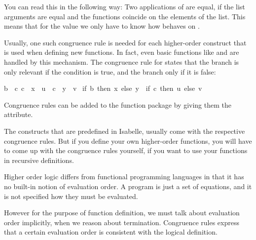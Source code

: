 \begin{isabellebody}
\begin{isamarkuptext}
  You can read this in the following way: Two applications of  are equal, if the list arguments are equal and the functions
  coincide on the elements of the list. This means that for the value 
   we only have to know how  behaves on
  .

  Usually, one such congruence rule is
  needed for each higher-order construct that is used when defining
  new functions. In fact, even basic functions like  and  are handled by this mechanism. The congruence
  rule for  states that the  branch is only
  relevant if the condition is true, and the  branch only if it
  is false:

  \begin{isabelle}%
{\isasymlbrakk}{\isacharquery}b\ {\isacharequal}\ {\isacharquery}c{\isacharsemicolon}\ {\isacharquery}c\ {\isasymLongrightarrow}\ {\isacharquery}x\ {\isacharequal}\ {\isacharquery}u{\isacharsemicolon}\ {\isasymnot}\ {\isacharquery}c\ {\isasymLongrightarrow}\ {\isacharquery}y\ {\isacharequal}\ {\isacharquery}v{\isasymrbrakk}\isanewline
{\isasymLongrightarrow}\ {\isacharparenleft}if\ {\isacharquery}b\ then\ {\isacharquery}x\ else\ {\isacharquery}y{\isacharparenright}\ {\isacharequal}\ {\isacharparenleft}if\ {\isacharquery}c\ then\ {\isacharquery}u\ else\ {\isacharquery}v{\isacharparenright}%
\end{isabelle}
  
  Congruence rules can be added to the
  function package by giving them the  attribute.

  The constructs that are predefined in Isabelle, usually
  come with the respective congruence rules.
  But if you define your own higher-order functions, you will have to
  come up with the congruence rules yourself, if you want to use your
  functions in recursive definitions.%
\end{isamarkuptext}%
\isamarkuptrue%
%
\isamarkuptrue%
%
\begin{isamarkuptext}%
Higher order logic differs from functional programming languages in
  that it has no built-in notion of evaluation order. A program is
  just a set of equations, and it is not specified how they must be
  evaluated. 

  However for the purpose of function definition, we must talk about
  evaluation order implicitly, when we reason about termination.
  Congruence rules express that a certain evaluation order is
  consistent with the logical definition. 


\end{isamarkuptext}
\end{isabellebody}
